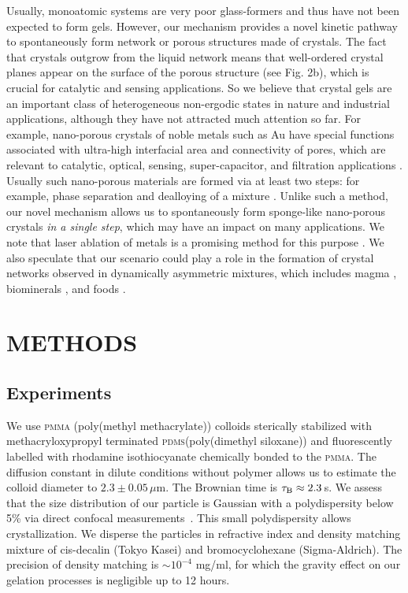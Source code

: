 \documentclass[preprint,amsmath,amssymb,superscriptaddress]{revtex4-1}
\begin{document}
Usually, monoatomic systems are very poor glass-formers and thus have not been expected to form gels. 
However, our mechanism provides a novel kinetic pathway to spontaneously form network or porous structures made of crystals.  The fact that crystals outgrow from the liquid network means that well-ordered crystal planes appear on the surface of the porous structure (see Fig. 2b), which is crucial for catalytic and sensing applications. So we believe that crystal gels are an important class of heterogeneous non-ergodic states in nature 
and industrial applications, although they have not attracted much attention so far.  
For example, nano-porous crystals of noble metals such as Au have special functions associated with ultra-high interfacial area and connectivity of pores, which are relevant to catalytic, optical, sensing, super-capacitor, and filtration applications 
\cite{ding2004nanoporous, ding2009nanoporous, wittstock2010nanoporous,fujita2012atomic}. Usually such nano-porous materials are formed via at least two steps: for example, phase separation and dealloying of a mixture
\cite{erlebacher2001evolution}. Unlike such a method, our novel mechanism allows us to spontaneously form sponge-like nano-porous crystals \emph{in a single step}, 
which may have an impact on many applications. 
We note that laser ablation of metals is a promising method for this purpose \cite{povarnitsyn2013mechanisms}.
We also speculate that our scenario could play a role in the formation of crystal networks observed in dynamically asymmetric mixtures, 
which includes magma \cite{philpotts1998role}, biominerals \cite{rousseau2005multiscale}, and foods \cite{deman1987fat}. 

\section*{METHODS}

\subsection*{Experiments}

We use \textsc{pmma} (poly(methyl methacrylate)) colloids sterically stabilized with methacryloxypropyl terminated \textsc{pdms}(poly(dimethyl siloxane)) and fluorescently labelled with rhodamine isothiocyanate chemically bonded to the \textsc{pmma}.
The diffusion constant in dilute conditions without polymer allows us to estimate the colloid diameter to $2.3\pm 0.05\, \mu$m. The Brownian time is $\tau_{\rm B} \approx 2.3\,$s. 
We assess that the size distribution of our particle is Gaussian with a polydispersity below 5\% via direct confocal measurements~\cite{Leocmach2013}.
This small polydispersity allows crystallization.
We disperse the particles in refractive index and density matching mixture of cis-decalin (Tokyo Kasei) and bromocyclohexane (Sigma-Aldrich). 
The precision of density matching is $\sim 10^{-4}$ mg/ml, for which the gravity effect on our gelation processes is negligible up to 12 hours.
\end{document}
